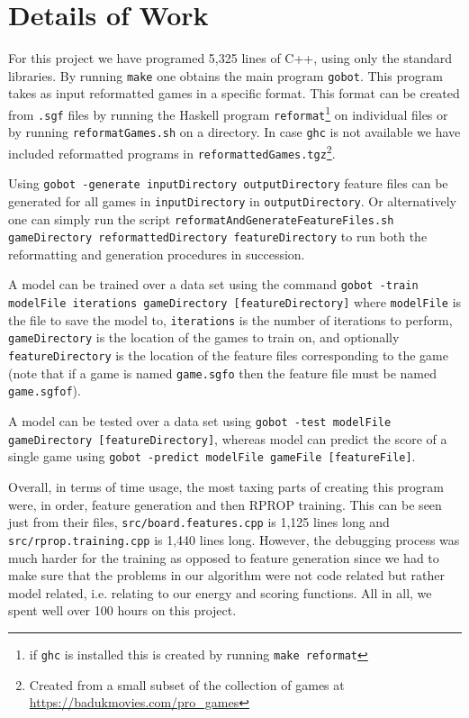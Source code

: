 \documentclass[11pt,letterpaper]{article}
\begin{document}
\section{Details of Work}

For this project we have programed 5,325 lines of C++, using only the standard libraries. By running {\tt make}
one obtains the main program {\tt gobot}. This program takes as input reformatted games in a specific format.
This format can be created from {\tt *.sgf} files by running the Haskell program {\tt reformat}\footnote{if {\tt ghc} is
installed this is created by running {\tt make reformat}} on individual files or by running {\tt  reformatGames.sh} on
a directory. In case {\tt ghc} is not available we have included reformatted programs in
{\tt reformattedGames.tgz}\footnote{Created from a small subset of the collection of games at
\url{https://badukmovies.com/pro_games}}.

Using {\tt gobot -generate inputDirectory outputDirectory} feature files can be generated for all games in
{\tt inputDirectory} in {\tt outputDirectory}. Or alternatively one can simply run the script
{\tt reformatAndGenerateFeatureFiles.sh gameDirectory reformattedDirectory featureDirectory} to run both the
reformatting and generation procedures in succession.

A model can be trained over a data set using the command
{\tt gobot -train modelFile iterations gameDirectory [featureDirectory]} where {\tt modelFile} is the file to save the
model to, {\tt iterations} is the number of iterations to perform, {\tt gameDirectory} is the location of the games to
train on, and optionally {\tt featureDirectory} is the location of the feature files corresponding to the game (note that
if a game is named {\tt game.sgfo} then the feature file must be named {\tt game.sgfof}).

A model can be tested over a data set using {\tt gobot -test modelFile gameDirectory [featureDirectory]}, whereas
model can predict the score of a single game using {\tt gobot -predict modelFile gameFile [featureFile]}.

Overall, in terms of time usage, the most taxing parts of creating this program were, in order, feature generation and
then RPROP training. This can be seen just from their files, {\tt src/board.features.cpp} is 1,125 lines long and
{\tt src/rprop.training.cpp} is 1,440 lines long. However, the debugging process was much harder for the training as
opposed to feature generation since we had to make sure that the problems in our algorithm were not code related
but rather model related, i.e. relating to our energy and scoring functions. All in all, we spent well over 100 hours on
this project.
\end{document}
